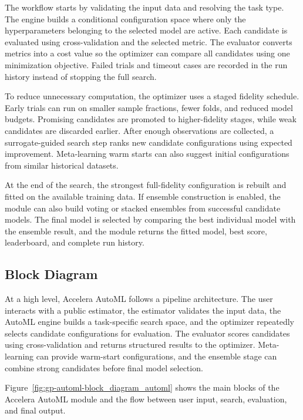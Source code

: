 \documentclass[12pt,a4paper]{report}
\begin{document}
\noindent The workflow starts by validating the input data and resolving the task type.
The engine builds a conditional configuration space where only the
hyperparameters belonging to the selected model are active. Each candidate is
evaluated using cross-validation and the selected metric. The evaluator converts
metrics into a cost value so the optimizer can compare all candidates using one
minimization objective. Failed trials and timeout cases are recorded in the run
history instead of stopping the full search.

\noindent To reduce unnecessary computation, the optimizer uses a staged fidelity
schedule. Early trials can run on smaller sample fractions, fewer folds, and
reduced model budgets. Promising candidates are promoted to higher-fidelity
stages, while weak candidates are discarded earlier. After enough observations
are collected, a surrogate-guided search step ranks new candidate configurations
using expected improvement. Meta-learning warm starts can also suggest initial
configurations from similar historical datasets.

\noindent At the end of the search, the strongest full-fidelity configuration is rebuilt
and fitted on the available training data. If ensemble construction is enabled,
the module can also build voting or stacked ensembles from successful candidate
models. The final model is selected by comparing the best individual model with
the ensemble result, and the module returns the fitted model, best score,
leaderboard, and complete run history.

\subsection{Block Diagram}
At a high level, Accelera AutoML follows a pipeline architecture. The user
interacts with a public estimator, the estimator validates the input data, the
AutoML engine builds a task-specific search space, and the optimizer repeatedly
selects candidate configurations for evaluation. The evaluator scores
candidates using cross-validation and returns structured results to the
optimizer. Meta-learning can provide warm-start configurations, and the ensemble
stage can combine strong candidates before final model selection.



Figure~\ref{fig:gp-automl-block_diagram_automl} shows the main blocks of the
Accelera AutoML module and the flow between user input, search, evaluation, and
final output.
\end{document}
